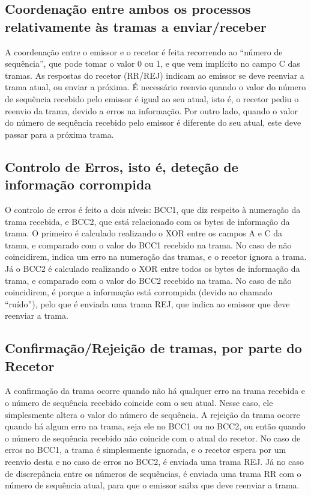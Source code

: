 \documentclass[article, a4paper, 11pt, oneside]{memoir}
\begin{document}
\subsection{Coordenação entre ambos os processos relativamente às tramas a enviar/receber}
A coordenação entre o emissor e o recetor é feita recorrendo ao “número de sequência”,
 que pode tomar o valor 0 ou 1, e que vem implícito no campo C das tramas. 
 As respostas do recetor (RR/REJ) indicam ao emissor se deve reenviar a trama atual,
  ou enviar a próxima. É necessário reenvio quando o valor do número de sequência 
  recebido pelo emissor é igual ao seu atual, isto é, o recetor pediu o reenvio da trama, 
  devido a erros na informação. Por outro lado, quando o valor do número de sequência recebido 
  pelo emissor é diferente do seu atual, este deve passar para a próxima trama.

\subsection{Controlo de Erros, isto é, deteção de informação corrompida}
O controlo de erros é feito a dois níveis: BCC1, que diz respeito à numeração da trama recebida,
 e BCC2, que está relacionado com os bytes de informação da trama. 
 O primeiro é calculado realizando o XOR entre os campos A e C da trama, 
 e comparado com o valor do BCC1 recebido na trama. No caso de não coincidirem, 
 indica um erro na numeração das tramas, e o recetor ignora a trama. Já o BCC2 é 
 calculado realizando o XOR entre todos os bytes de informação da trama, e 
 comparado com o valor do BCC2 recebido na trama. No caso de não coincidirem, 
 é porque a informação está corrompida (devido ao chamado “ruído”), 
 pelo que é enviada uma trama REJ, que indica ao emissor que deve reenviar a trama.

\subsection{Confirmação/Rejeição de tramas, por parte do Recetor}
A confirmação da trama ocorre quando não há qualquer erro na trama recebida e o número de sequência recebido coincide com o seu atual. 
Nesse caso, ele simplesmente altera o valor do número de sequência.
A rejeição da trama ocorre quando há algum erro na trama, seja ele no BCC1 ou no BCC2, ou então quando o número de sequência recebido não coincide com o atual do recetor.
 No caso de erros no BCC1, a trama é simplesmente ignorada, e o recetor espera por um reenvio desta e no caso de erros no BCC2, é enviada uma trama REJ. 
 Já no caso de discrepância entre os números de sequências, é enviada uma trama RR com o número de sequência atual, para que o emissor saiba que deve reenviar a trama.
 
\end{document}
